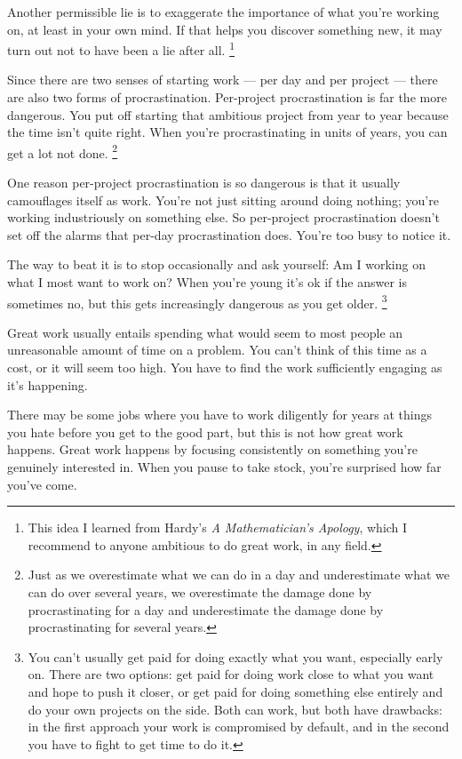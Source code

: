 Another permissible lie is to exaggerate the importance of what you're
working on, at least in your own mind. If that helps you discover
something new, it may turn out not to have been a lie after all.
\footnote{This idea I learned from Hardy's \emph{A Mathematician's
Apology}, which I recommend to anyone ambitious to do great work, in any
field.}

Since there are two senses of starting work --- per day and per project
--- there are also two forms of procrastination. Per-project
procrastination is far the more dangerous. You put off starting that
ambitious project from year to year because the time isn't quite right.
When you're procrastinating in units of years, you can get a lot not
done. \footnote{Just as we overestimate what we can do in a day and
underestimate what we can do over several years, we overestimate the
damage done by procrastinating for a day and underestimate the damage
done by procrastinating for several years.}

One reason per-project procrastination is so dangerous is that it
usually camouflages itself as work. You're not just sitting around doing
nothing; you're working industriously on something else. So per-project
procrastination doesn't set off the alarms that per-day procrastination
does. You're too busy to notice it.

The way to beat it is to stop occasionally and ask yourself: Am I
working on what I most want to work on? When you're young it's ok if the
answer is sometimes no, but this gets increasingly dangerous as you get
older. \footnote{You can't usually get paid for doing exactly what you want,
especially early on. There are two options: get paid for doing work
close to what you want and hope to push it closer, or get paid for doing
something else entirely and do your own projects on the side. Both can
work, but both have drawbacks: in the first approach your work is
compromised by default, and in the second you have to fight to get time
to do it.}

Great work usually entails spending what would seem to most people an
unreasonable amount of time on a problem. You can't think of this time
as a cost, or it will seem too high. You have to find the work
sufficiently engaging as it's happening.

There may be some jobs where you have to work diligently for years at
things you hate before you get to the good part, but this is not how
great work happens. Great work happens by focusing consistently on
something you're genuinely interested in. When you pause to take stock,
you're surprised how far you've come.

